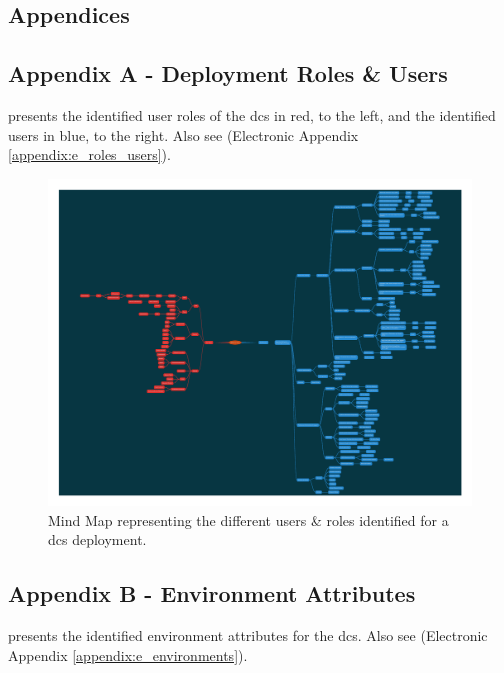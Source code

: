 \begin{appendices}

\chapter{Appendices}
\label{ch:appendices}

\section{Appendix A - Deployment Roles \& Users}
\label{appendix:roles_users}

 presents the identified user roles of the \acrfull{dcs} in red, to the left, and the identified users in blue, to the right. Also see (Electronic Appendix \ref{appendix:e_roles_users}).

\begin{figure}[htp]
    \centering
    \label{fig:appendix_roles_users}
    \includegraphics[width=\linewidth]{appendices/mind_maps/ABE_Users_slides_Oct26.pdf}
    \caption{Mind Map representing the different users \& roles identified for a \acrshort{dcs} deployment.}
\end{figure}

\clearpage

\section{Appendix B - Environment Attributes}
\label{appendix:environments}

 presents the identified environment attributes for the \acrfull{dcs}. Also see (Electronic Appendix \ref{appendix:e_environments}).


\end{appendices}
